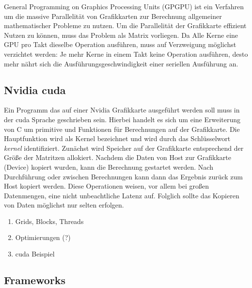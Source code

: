 General Programming on Graphics Processing Units (GPGPU) ist ein Verfahren um die massive Parallelität von Grafikkarten zur Berechnung allgemeiner mathematischer Probleme zu nutzen. Um die Parallelität der Grafikkarte effizient Nutzen zu können, muss das Problem als Matrix vorliegen. Da Alle Kerne eine GPU pro Takt dieselbe Operation ausführen, muss auf Verzweigung möglichst verzichtet werden: Je mehr Kerne  in einem Takt keine Operation ausführen, desto mehr nährt sich die Ausführungsgeschwindigkeit einer seriellen Ausführung an.

\subsection{Nvidia cuda}

Ein Programm das auf einer Nvidia Grafikkarte ausgeführt werden soll muss in der cuda Sprache geschrieben sein. Hierbei handelt es sich um eine Erweiterung von C um primitive und Funktionen für Berechnungen auf der Grafikkarte. Die Hauptfunktion wird als Kernel bezeichnet und wird durch das Schlüsselwort \textit{\textunderscore\textunderscore kernel\textunderscore\textunderscore} identifiziert. Zunächst wird Speicher auf der Grafikkarte entsprechend der Größe der Matritzen allokiert. Nachdem die Daten von Host zur Grafikkarte (Device) kopiert wurden, kann die Berechnung gestartet werden. Nach Durchführung oder zwischen Berechnungen kann dann das Ergebnis zurück zum Host kopiert werden. Diese Operationen weisen, vor allem bei großen Datenmengen, eine nicht unbeachtliche Latenz auf. Folglich sollte das Kopieren von Daten möglichst nur selten erfolgen.

\begin{enumerate}
	\item Grids, Blocks, Threads
	\item Optimierungen (?)
	\item cuda Beispiel
\end{enumerate}

\subsection{Frameworks}